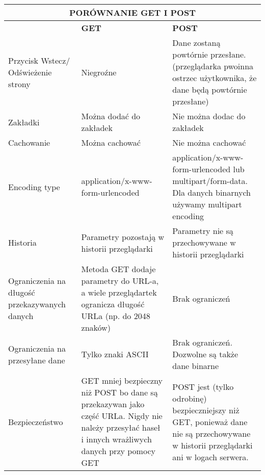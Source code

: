 \documentclass[../main.tex]{subfiles}
\begin{document}
    \begin{table}[H]
        \begin{center}
            \begin{tabular}{|p{5cm}|p{5cm}|p{5cm}|}
                \hline
                \multicolumn{3}{|c|}{\textbf{PORÓWNANIE GET I POST}}\\
                \hline
                &\textbf{GET} & \textbf{POST}\\
                \hline
                \hline
                Przycisk Wstecz/ Odświeżenie strony
                &
                Niegroźne
                &
                Dane zostaną powtórnie przesłane. (przeglądarka pwoinna ostrzec użytkownika, że dane będą powtórnie przesłane)
                \\
                \hline
                Zakładki
                &
                Można dodać do zakładek
                &
                Nie można dodac do zakładek
                \\
                \hline
                Cachowanie
                &
                Można cachować
                &
                Nie można cachować
                \\
                \hline
                Encoding type
                &
                application/x-www-form-urlencoded
                &
                application/x-www-form-urlencoded lub multipart/form-data. Dla danych binarnych używamy multipart encoding
                \\
                \hline
                Historia
                &
                Parametry pozostają w historii przeglądarki
                &
                Parametry nie są przechowywane w historii przeglądarki
                \\
                \hline
                Ograniczenia na długość przekazywanych danych
                &
                Metoda GET dodaje parametry do URL-a, a wiele przeglądartek ogranicza długość URLa (np. do 2048 znaków)
                &
                Brak ograniczeń
                \\
                \hline
                Ograniczenia na przesyłane dane
                &
                Tylko znaki ASCII
                &
                Brak ograniczeń. Dozwolne są także dane binarne
                \\
                \hline
                Bezpieczeństwo
                &
                GET mniej bezpieczny niż POST bo dane są przekazywan jako część URLa.
                Nigdy nie należy przesyłać haseł i innych wrażliwych danych przy pomocy GET
                &
                POST jest (tylko odrobinę) bezpieczniejszy niż GET, ponieważ dane nie są przechowywane w historii przeglądarki ani w logach serwera.
                \\
                \hline
            \end{tabular}
        \end{center}
    \end{table}
\end{document}
